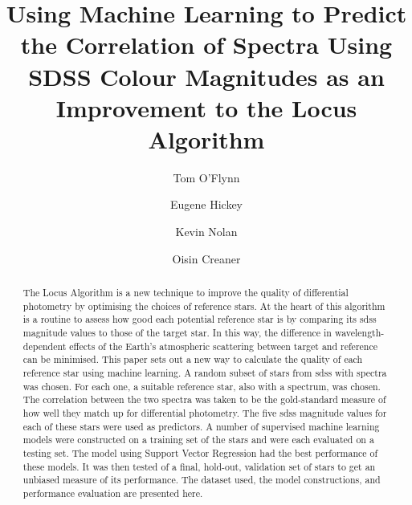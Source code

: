 \documentclass[preprint, 3p,
authoryear]{elsarticle} %
\begin{document}
\begin{frontmatter}

  \title{Using Machine Learning to Predict the Correlation of Spectra
Using SDSS Colour Magnitudes as an Improvement to the Locus Algorithm}
    \author[Technological University Dublin]{Tom O'Flynn}
    \author[Technological University Dublin]{Eugene Hickey%
  }
    \author[Technological University Dublin]{Kevin Nolan%
  }
    \author[Dublin Institute of Advanced Studies]{Oisin Creaner%
  }
  
  \begin{abstract}
  The Locus Algorithm is a new technique to improve the quality of
  differential photometry by optimising the choices of reference stars.
  At the heart of this algorithm is a routine to assess how good each
  potential reference star is by comparing its sdss magnitude values to
  those of the target star. In this way, the difference in
  wavelength-dependent effects of the Earth's atmospheric scattering
  between target and reference can be minimised. This paper sets out a
  new way to calculate the quality of each reference star using machine
  learning. A random subset of stars from sdss with spectra was chosen.
  For each one, a suitable reference star, also with a spectrum, was
  chosen. The correlation between the two spectra was taken to be the
  gold-standard measure of how well they match up for differential
  photometry. The five sdss magnitude values for each of these stars
  were used as predictors. A number of supervised machine learning
  models were constructed on a training set of the stars and were each
  evaluated on a testing set. The model using Support Vector Regression
  had the best performance of these models. It was then tested of a
  final, hold-out, validation set of stars to get an unbiased measure of
  its performance. The dataset used, the model constructions, and
  performance evaluation are presented here.
  \end{abstract}
  
 \end{frontmatter}
\end{document}
